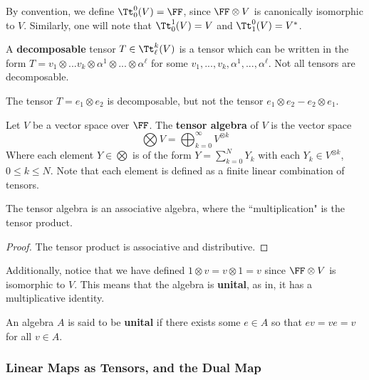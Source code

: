 By convention, we define $\Tt_0^0(V) = \FF$, since $\FF\otimes V$ is canonically isomorphic to $V$. Similarly, one will note that $\Tt_0^1(V)=V$ and $\Tt_1^0(V) = V^*$.

\begin{defn}
    A \textbf{decomposable} tensor $T \in \Tt_\ell^k(V)$ is a tensor which can be written in the form $T = v_1\otimes...v_k \otimes \alpha^1\otimes...\otimes \alpha^\ell$ for some $v_1,...,v_k,\alpha^1,...,\alpha^\ell$. Not all tensors are decomposable.
\end{defn}
\begin{example}
The tensor $T = e_1\otimes e_2$ is decomposable, but not the tensor $e_1\otimes e_2 - e_2\otimes e_1$.
\end{example}
\begin{defn} Let $V$ be a vector space over $\FF$. The \textbf{tensor algebra} of $V$ is the vector space
\begin{equation}
    \bigotimes V = \bigoplus_{k=0}^\infty V^{\otimes k}
\end{equation}
Where each element $Y\in \bigotimes$ is of the form $Y = \sum_{k=0}^N Y_k$ with each $Y_k \in V^{\otimes k}$, $0\leq k \leq N$. Note that each element is defined as a finite linear combination of tensors.\label{defn:tensoralgebra}
\end{defn}
\begin{lemma}
The tensor algebra is an associative algebra, where the ``multiplication" is the tensor product.
\end{lemma}
\begin{proof}
The tensor product is associative and distributive.
\end{proof}
Additionally, notice that we have defined $1\otimes v = v \otimes 1 = v$ since $\FF\otimes V$ is isomorphic to $V$. This means that the algebra is \textbf{unital}, as in, it has a multiplicative identity.
\begin{defn}
An algebra $A$ is said to be \textbf{unital} if there exists some $e \in A$ so that $ev = ve = v$ for all $v \in A$. 
\end{defn}

\subsubsection{Linear Maps as Tensors, and the Dual Map}

